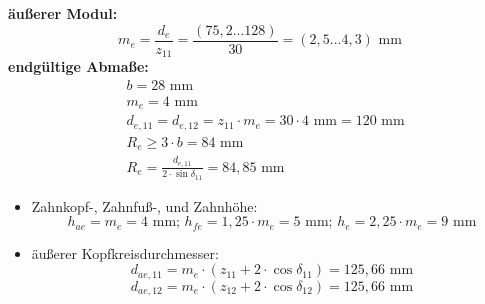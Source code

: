 \textbf{äußerer Modul:}
\[
m_e = \frac{d_e}{z_{11}} = \frac{(75,2...128)}{30} = (2,5...4,3) \text{ mm}
\]
\textbf{endgültige Abmaße:}
\begin{align*}
	&b= 28 \text{ mm} \\
	&m_e=4 \text{ mm} \\ 
	&d_{e,11} =d_{e,12} = z_{11} \cdot m_e = 30 \cdot 4 \text{ mm} = 120 \text{ mm} \\
	&R_e \ge 3 \cdot b = 84 \text{ mm} \\
	&R_e = \frac{d_{e,11}}{2 \cdot \sin \delta_{11}} = 84,85 \text{ mm}
\end{align*}
\begin{itemize}
	\item Zahnkopf-, Zahnfuß-, und Zahnhöhe:
	\[
	h_{ae} = m_e = 4 \text{ mm; } h_{fe} = 1,25 \cdot m_e =5 \text{ mm; } h_e = 2,25 \cdot m_e = 9 \text{ mm}
	\]
	\item äußerer Kopfkreisdurchmesser:
	\[
	d_{ae,11} = m_e \cdot (z_{11} + 2 \cdot \cos \delta_{11}) = 125,66 \text{ mm}
	\]
	\[
	d_{ae,12} = m_e \cdot (z_{12} + 2 \cdot \cos \delta_{12}) = 125,66 \text{ mm}
	\]
\end{itemize}